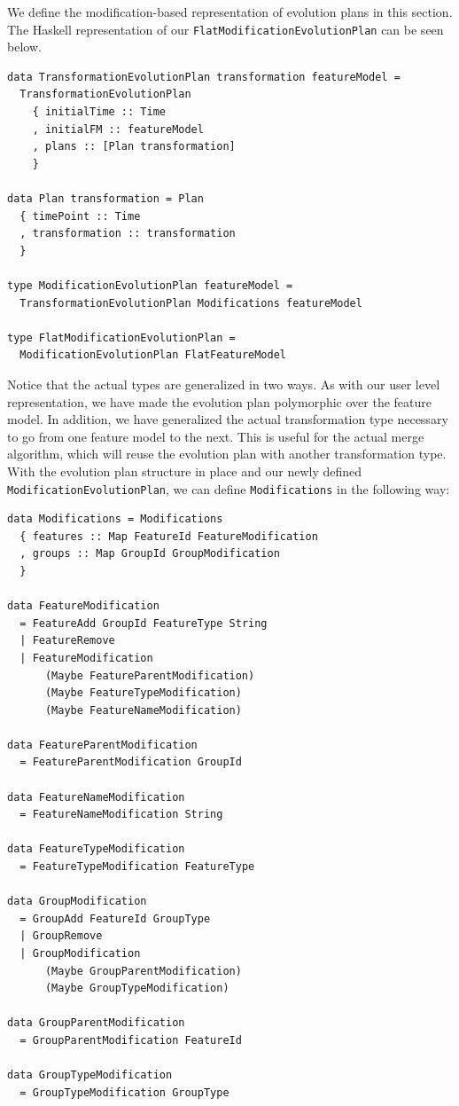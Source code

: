 \documentclass[a4paper,english]{ifimaster}
\begin{document}
We define the modification-based representation of evolution plans in this section. The Haskell representation of our \texttt{Flat\-Modification\-Evolution\-Plan} can be seen below.

\begin{verbatim}
data TransformationEvolutionPlan transformation featureModel = 
  TransformationEvolutionPlan
    { initialTime :: Time
    , initialFM :: featureModel
    , plans :: [Plan transformation]
    }

data Plan transformation = Plan
  { timePoint :: Time
  , transformation :: transformation
  }

type ModificationEvolutionPlan featureModel = 
  TransformationEvolutionPlan Modifications featureModel

type FlatModificationEvolutionPlan = 
  ModificationEvolutionPlan FlatFeatureModel
\end{verbatim}

Notice that the actual types are generalized in two ways. As with our user level representation, we have made the evolution plan polymorphic over the feature model. In addition, we have generalized the actual transformation type necessary to go from one feature model to the next. This is useful for the actual merge algorithm, which will reuse the evolution plan with another transformation type. With the evolution plan structure in place and our newly defined \texttt{Modification\-Evolution\-Plan}, we can define \texttt{Modifications} in the following way:

\begin{verbatim}
data Modifications = Modifications
  { features :: Map FeatureId FeatureModification
  , groups :: Map GroupId GroupModification
  }

data FeatureModification
  = FeatureAdd GroupId FeatureType String
  | FeatureRemove
  | FeatureModification
      (Maybe FeatureParentModification)
      (Maybe FeatureTypeModification)
      (Maybe FeatureNameModification)

data FeatureParentModification
  = FeatureParentModification GroupId

data FeatureNameModification
  = FeatureNameModification String

data FeatureTypeModification
  = FeatureTypeModification FeatureType

data GroupModification
  = GroupAdd FeatureId GroupType
  | GroupRemove
  | GroupModification
      (Maybe GroupParentModification)
      (Maybe GroupTypeModification)

data GroupParentModification
  = GroupParentModification FeatureId

data GroupTypeModification
  = GroupTypeModification GroupType
\end{verbatim}
\end{document}
